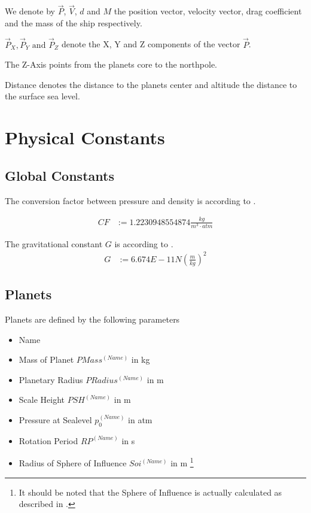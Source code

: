 \documentclass[11pt]{report}
\newcommand{\oa}[1]{\overrightarrow{#1}}
\newcommand{\Pos}{\oa{P}}
\newcommand{\Vel}{\oa{V}}
\begin{document}
We denote by $\Pos$, $\Vel$, $d$ and $M$ the 
position vector,  velocity vector, drag
coefficient and the mass of the ship respectively.

$\Pos_X, \Pos_Y \textrm{ and } \Pos_Z$ denote the X, Y and Z
components of the vector $\Pos$.

The Z-Axis points from the planets core to the northpole.

Distance denotes the distance to the planets center and altitude the
distance to the surface sea level.


\chapter{Physical Constants}

\section{Global Constants}

The  conversion factor between pressure and
density is according to \cite{Atmo}.

\begin{align}
  CF &:= 1.2230948554874 \frac{kg}{m^3\cdot atm}
\end{align}

The  gravitational constant $G$ is according to \cite{ACB}.
\begin{align}
  G &:= 6.674E-11 N\left(\frac{m}{kg}\right)^2
\end{align}

\section{Planets}

Planets are defined by the following parameters

\begin{itemize}
\item Name
\item {} Mass of Planet $PMass^{(Name)}$ in kg
\item {} Planetary Radius $PRadius^{(Name)}$ in m
\item {} Scale Height $PSH^{(Name)}$ in m
\item {} Pressure at Sealevel $p_0^{(Name)}$ in atm
\item {} Rotation Period $RP^{(Name)}$ in s
\item {} Radius of Sphere of Influence $Soi^{(Name)}$ in m \footnote{It should be noted that the Sphere of Influence is actually calculated
as described in \cite{SphereOfInfluence}.}
\end{itemize}
\end{document}
